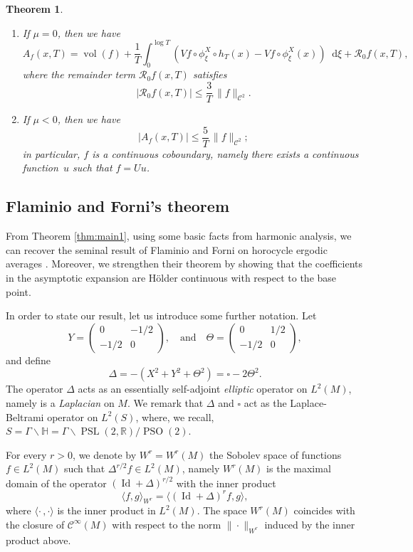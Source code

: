 \documentclass[JEP,XML,SOM,NoEqCountersInSection,Unicode,published]{cedram}
\newenvironment{enumeratei}
{\bgroup\def\theenumi{\roman{enumi}}\def\theenumii{\arabic{enumii}}\begin{enumerate}}
{\end{enumerate}\egroup}
\newcommand \R{\mathbb{R}}
\newcommand \Hbb{\mathbb{H}}
\newcommand*{\diff}{\mathop{}\!\mathrm{d}}
\newcommand{\aver}[1]{A_{#1}(x,T)}
\DeclareMathOperator{\PSL}{PSL}
\DeclareMathOperator{\PSO}{PSO}
\DeclareMathOperator{\vol}{vol}
\DeclareMathOperator{\Id}{Id}
\newtheorem{theorem}{Theorem}
\theoremstyle{definition}
\begin{document}
\begin{theorem}
\begin{enumeratei}
\item\label{thm:main1iv}
If $\mu = 0$, then we have
\[
\aver{f} = \vol(f) + \frac{1}{T} \int_0^{\log T} \left(Vf \circ \phi^X_\xi \circ h_T(x) - Vf\circ \phi^X_\xi (x) \right) \diff \xi + \mathcal{R}_{0}f(x,T),
\]
where the remainder term $\mathcal{R}_{0}f(x,T)$ satisfies
\[
|\mathcal{R}_{0}f(x,T)|\leq \frac{3}{T}\, \|f\|_{\mathscr{C}^2}.
\]

\item\label{thm:main1v}
If $\mu < 0$, then we have
\[
|\aver{f} |\leq \frac{5}{T}\, \|f\|_{\mathscr{C}^2};
\]
in particular, $f$ is a continuous coboundary, namely there exists a continuous function~$u$ such that $f=Uu$.
\end{enumeratei}
\end{theorem}

\subsection{Flaminio and Forni's theorem}

From Theorem \ref{thm:main1}, using some basic facts from harmonic analysis, we can recover the seminal result of Flaminio and Forni on horocycle ergodic averages \cite[Th.\,1.5]{FlaFo}.
Moreover, we strengthen their theorem by showing that the coefficients in the asymptotic expansion are Hölder continuous with respect to the base point.

In order to state our result, let us introduce some further notation.
Let
\[
Y =
\begin{pmatrix}
0 & -1/2 \\
-1/2 & 0
\end{pmatrix},
\ \ \ \text{ and }\ \ \
\Theta =
\begin{pmatrix}
0 & 1/2 \\
-1/2 & 0
\end{pmatrix},
\]
and define
\[
\Delta = -(X^2 + Y^2 + \Theta^2) = \square - 2 \Theta^2.
\]
The operator $\Delta$ acts as an essentially self-adjoint \emph{elliptic} operator on $L^2(M)$, namely is a \emph{Laplacian} on $M$.
We remark that $\Delta$ and $\square$ act as the Laplace-Beltrami operator on $L^2(S)$, where, we recall, $S = \Gamma \backslash \Hbb = \Gamma \backslash \PSL(2,\R) / \PSO(2)$.

For every $r >0$, we denote by $W^r=W^r(M)$ the Sobolev space of functions $f \in L^2(M)$ such that $\Delta^{r/2}f \in L^2(M)$, namely $W^r(M)$ is the maximal domain of the operator $(\Id + \Delta)^{r/2}$ with the inner product
\begin{equation}\label{eq:def_inn_prod_Wr}
\langle f,g \rangle_{W^r} = \langle (\Id + \Delta)^rf,g \rangle,
\end{equation}
where $\langle \cdot\,, \cdot \rangle$ is the inner product in $L^2(M)$.
The space $W^r(M)$ coincides with the closure of $\mathscr{C}^\infty(M)$ with respect to the norm $\|{\cdot} \|_{W^r}$ induced by the inner product above.
\end{document}
